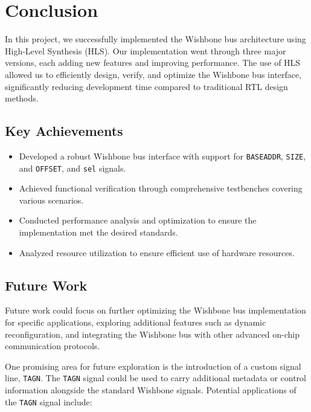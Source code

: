 \documentclass[12pt]{report}
\begin{document}
\section{Conclusion}

In this project, we successfully implemented the Wishbone bus architecture using High-Level Synthesis (HLS). Our implementation went through three major versions, each adding new features and improving performance. The use of HLS allowed us to efficiently design, verify, and optimize the Wishbone bus interface, significantly reducing development time compared to traditional RTL design methods.

\subsection{Key Achievements}
\begin{itemize}
    \item Developed a robust Wishbone bus interface with support for \texttt{BASEADDR}, \texttt{SIZE}, and \texttt{OFFSET}, and \texttt{sel} signals.
    \item Achieved functional verification through comprehensive testbenches covering various scenarios.
    \item Conducted performance analysis and optimization to ensure the implementation met the desired standards.
    \item Analyzed resource utilization to ensure efficient use of hardware resources.
\end{itemize}

\subsection{Future Work}
Future work could focus on further optimizing the Wishbone bus implementation for specific applications, exploring additional features such as dynamic reconfiguration, and integrating the Wishbone bus with other advanced on-chip communication protocols.

One promising area for future exploration is the introduction of a custom signal line, \texttt{TAGN}. The \texttt{TAGN} signal could be used to carry additional metadata or control information alongside the standard Wishbone signals. Potential applications of the \texttt{TAGN} signal include:
\end{document}
